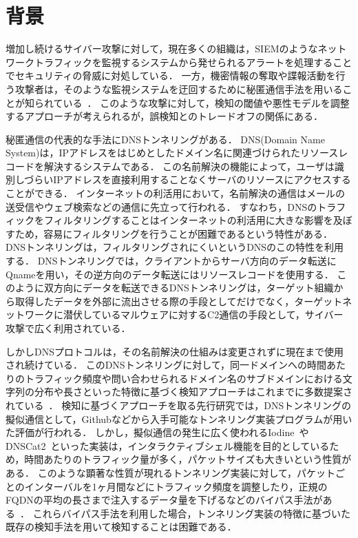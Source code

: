\section{背景}
増加し続けるサイバー攻撃に対して，現在多くの組織は，SIEMのようなネットワークトラフィックを監視するシステムから発せられるアラートを処理することでセキュリティの脅威に対処している．
一方，機密情報の奪取や諜報活動を行う攻撃者は，そのような監視システムを迂回するために秘匿通信手法を用いることが知られている~\cite{mitre-custom-c2}．
このような攻撃に対して，検知の閾値や悪性モデルを調整するアプローチが考えられるが，誤検知とのトレードオフの関係にある．

秘匿通信の代表的な手法にDNSトンネリングがある．
DNS(Domain Name System)は，IPアドレスをはじめとしたドメイン名に関連づけられたリソースレコードを解決するシステムである．
この名前解決の機能によって，ユーザは識別しづらいIPアドレスを直接利用することなくサーバのリソースにアクセスすることができる．
インターネットの利活用において，名前解決の通信はメールの送受信やウェブ検索などの通信に先立って行われる．
すなわち，DNSのトラフィックをフィルタリングすることはインターネットの利活用に大きな影響を及ぼすため，容易にフィルタリングを行うことが困難であるという特性がある．
DNSトンネリングは，フィルタリングされにくいというDNSのこの特性を利用する．
DNSトンネリングでは，クライアントからサーバ方向のデータ転送にQnameを用い，その逆方向のデータ転送にはリソースレコードを使用する．
このように双方向にデータを転送できるDNSトンネリングは，ターゲット組織から取得したデータを外部に流出させる際の手段としてだけでなく，ターゲットネットワークに潜伏しているマルウェアに対するC2通信の手段として，サイバー攻撃で広く利用されている．

しかしDNSプロトコルは，その名前解決の仕組みは変更されずに現在まで使用され続けている．
このDNSトンネリングに対して，同一ドメインへの時間あたりのトラフィック頻度や問い合わせられるドメイン名のサブドメインにおける文字列の分布や長さといった特徴に基づく検知アプローチはこれまでに多数提案されている~\cite{born, cheng, liu, asaf, steadman, jawad}．
検知に基づくアプローチを取る先行研究では，DNSトンネリングの擬似通信として，Githubなどから入手可能なトンネリング実装プログラムが用いた評価が行われる．
しかし，擬似通信の発生に広く使われるIodine~\cite{iodine}やDNSCat2~\cite{dnscat2}といった実装は，インタラクティブシェル機能を目的としているため，時間あたりのトラフィック量が多く，パケットサイズも大きいという性質がある．
このような顕著な性質が現れるトンネリング実装に対して，パケットごとのインターバルを1ヶ月間などにトラフィック頻度を調整したり，正規のFQDNの平均の長さまで注入するデータ量を下げるなどのバイパス手法がある~\cite{asaf}．
これらバイパス手法を利用した場合，トンネリング実装の特徴に基づいた既存の検知手法を用いて検知することは困難である．

